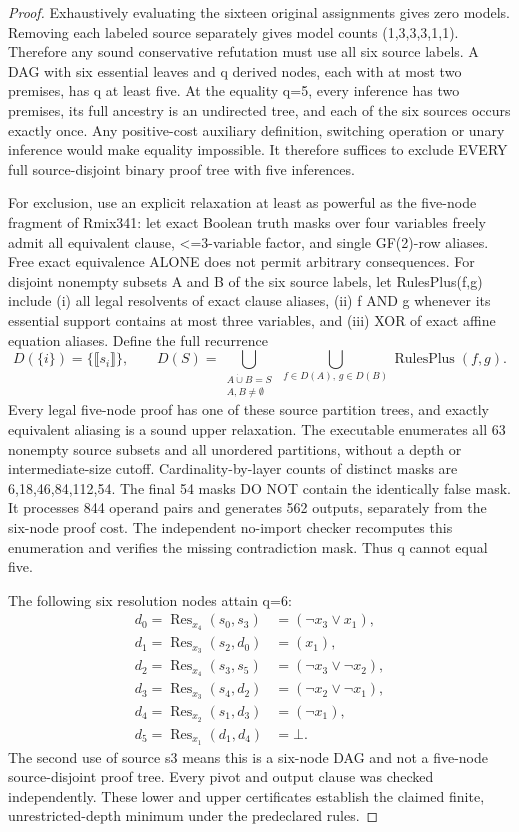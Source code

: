 \documentclass[11pt]{article}
\begin{document}
\begin{proof}
Exhaustively evaluating the sixteen original assignments gives zero models. Removing each labeled source separately gives model counts (1,3,3,3,1,1). Therefore any sound conservative refutation must use all six source labels. A DAG with six essential leaves and q derived nodes, each with at most two premises, has q at least five. At the equality q=5, every inference has two premises, its full ancestry is an undirected tree, and each of the six sources occurs exactly once. Any positive-cost auxiliary definition, switching operation or unary inference would make equality impossible. It therefore suffices to exclude EVERY full source-disjoint binary proof tree with five inferences.

For exclusion, use an explicit relaxation at least as powerful as the five-node fragment of Rmix341: let exact Boolean truth masks over four variables freely admit all equivalent clause, <=3-variable factor, and single GF(2)-row aliases. Free exact equivalence ALONE does not permit arbitrary consequences. For disjoint nonempty subsets A and B of the six source labels, let RulesPlus(f,g) include (i) all legal resolvents of exact clause aliases, (ii) f AND g whenever its essential support contains at most three variables, and (iii) XOR of exact affine equation aliases. Define the full recurrence
\[
D(\{i\})=\{\llbracket s_i\rrbracket\},\qquad
D(S)=\bigcup_{\substack{A\dot\cup B=S\\A,B\ne\emptyset}}
\ \bigcup_{f\in D(A),\,g\in D(B)}\operatorname{RulesPlus}(f,g).
\]
Every legal five-node proof has one of these source partition trees, and exactly equivalent aliasing is a sound upper relaxation. The executable enumerates all 63 nonempty source subsets and all unordered partitions, without a depth or intermediate-size cutoff. Cardinality-by-layer counts of distinct masks are 6,18,46,84,112,54. The final 54 masks DO NOT contain the identically false mask. It processes 844 operand pairs and generates 562 outputs, separately from the six-node proof cost. The independent no-import checker recomputes this enumeration and verifies the missing contradiction mask. Thus q cannot equal five.

The following six resolution nodes attain q=6:
\[
\begin{array}{lll}
d_0=\operatorname{Res}_{x_4}(s_0,s_3)&=(\neg x_3\vee x_1),\\
d_1=\operatorname{Res}_{x_3}(s_2,d_0)&=(x_1),\\
d_2=\operatorname{Res}_{x_4}(s_3,s_5)&=(\neg x_3\vee\neg x_2),\\
d_3=\operatorname{Res}_{x_3}(s_4,d_2)&=(\neg x_2\vee\neg x_1),\\
d_4=\operatorname{Res}_{x_2}(s_1,d_3)&=(\neg x_1),\\
d_5=\operatorname{Res}_{x_1}(d_1,d_4)&=\bot .
\end{array}
\]
The second use of source s3 means this is a six-node DAG and not a five-node source-disjoint proof tree. Every pivot and output clause was checked independently. These lower and upper certificates establish the claimed finite, unrestricted-depth minimum under the predeclared rules.
\end{proof}
\end{document}
